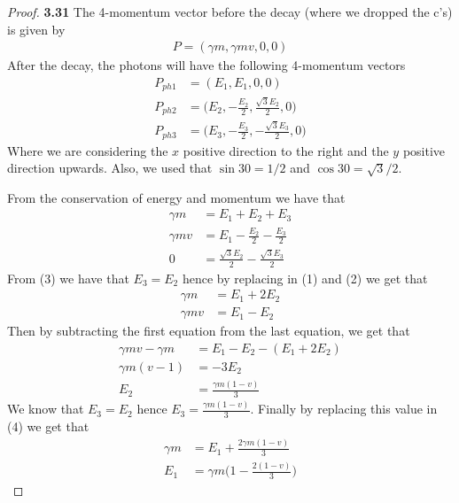 \documentclass[11pt]{article}
\theoremstyle{definition}
\begin{document}
\cleardoublepage
\begin{proof}{\textbf{3.31}}
    The 4-momentum vector before the decay (where we dropped the c's) is given
    by
    \begin{align*}
        P = (\gamma m, \gamma mv, 0, 0)
    \end{align*}
    After the decay, the photons will have the following 4-momentum vectors
    \begin{align*}
        P_{ph1} &= (E_1, E_1, 0, 0)\\
        P_{ph2} &= \bigg(E_2, -\frac{E_2}{2}, \frac{\sqrt{3}E_2}{2}, 0\bigg)\\
        P_{ph3} &= \bigg(E_3, -\frac{E_3}{2}, -\frac{\sqrt{3}E_3}{2}, 0\bigg)
    \end{align*}
    Where we are considering the $x$ positive direction to the right and the
    $y$ positive direction upwards. Also, we used that $\sin 30 = 1/2$ and
    $\cos 30 = \sqrt{3}/2$.

    From the conservation of energy and momentum we have that
    \begin{align}
        \gamma m &= E_1 + E_2 + E_3\\
        \gamma mv &= E_1 -\frac{E_2}{2} -\frac{E_3}{2}\\
        0 &= \frac{\sqrt{3}E_2}{2} - \frac{\sqrt{3}E_3}{2}
    \end{align}
    From (3) we have that $E_3 = E_2$ hence by replacing in (1) and (2) we get
    that
    \begin{align}
        \gamma m &= E_1 + 2E_2\\
        \gamma mv &= E_1 - E_2
    \end{align}
    Then by subtracting the first equation from the last equation, we get that
    \begin{align*}
        \gamma mv -\gamma m &= E_1 - E_2 -(E_1 + 2E_2)\\
        \gamma m(v - 1) &= -3E_2\\
        E_2 &= \frac{\gamma m(1 - v)}{3}
    \end{align*}
    We know that $E_3 = E_2$ hence $E_3 = \frac{\gamma m(1 - v)}{3}$.
    Finally by replacing this value in (4) we get that
    \begin{align*}
        \gamma m &= E_1 + \frac{2\gamma m(1 - v)}{3}\\
        E_1 &= \gamma m\bigg(1 - \frac{2(1 - v)}{3}\bigg)
    \end{align*}

\end{proof}
\end{document}
